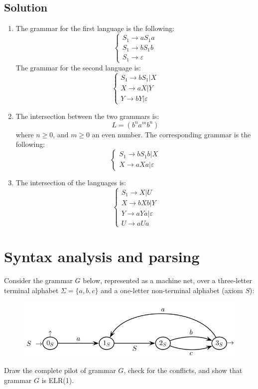 \documentclass[12pt, a4paper]{report}
\newtheorem[style=M,bodystyle=\normalfont]{theorem}{Theorem}
\newtheorem[style=M,bodystyle=\normalfont]{corollary}{Corollary}
\newtheorem[style=M,bodystyle=\normalfont]{lemma}{Lemma}
\newtheorem[style=M,bodystyle=\normalfont]{definition}{Definition}
\begin{document}
    \subsection*{Solution}
    \begin{enumerate}
        \item The grammar for the first language is the following: 
            \[\begin{cases}
                S_1 \rightarrow aS_1a           \\
                S_1 \rightarrow bS_1b           \\
                S_1 \rightarrow \varepsilon
            \end{cases}\]
            The grammar for the second language is: 
            \[\begin{cases}
                S_1 \rightarrow bS_1|X          \\
                X \rightarrow aX|Y              \\
                Y \rightarrow bY|\varepsilon
            \end{cases}\]
        \item The intersection between the two grammars is: 
            \[L=(b^na^mb^n)\]
            where $n \geq 0$, and $m \geq 0$ an even number. The corresponding grammar is the following: 
            \[\begin{cases}
                S_1 \rightarrow bS_1b | X \\
                X \rightarrow aXa | \varepsilon
            \end{cases}\]
        \item The intersection of the languages is: 
            \[\begin{cases}
                S_1 \rightarrow X | U               \\
                X \rightarrow bXb | Y               \\
                Y \rightarrow aYa | \varepsilon     \\
                U \rightarrow aUa   
            \end{cases}\]
    \end{enumerate}

    \newpage
    \section{Syntax analysis and parsing}
    Consider the grammar $G$ below, represented as a machine net, over a three-letter terminal alphabet $\Sigma=\{a,b,c\}$ and a one-letter non-terminal alphabet (axiom $S$):
    \begin{figure}[H]
        \centering
        \includegraphics[width=0.5\linewidth]{images/mnet.png}
    \end{figure}
    Draw the complete pilot of grammar $G$, check for the conflicts, and show that grammar $G$ is ELR(1).
\end{document}
